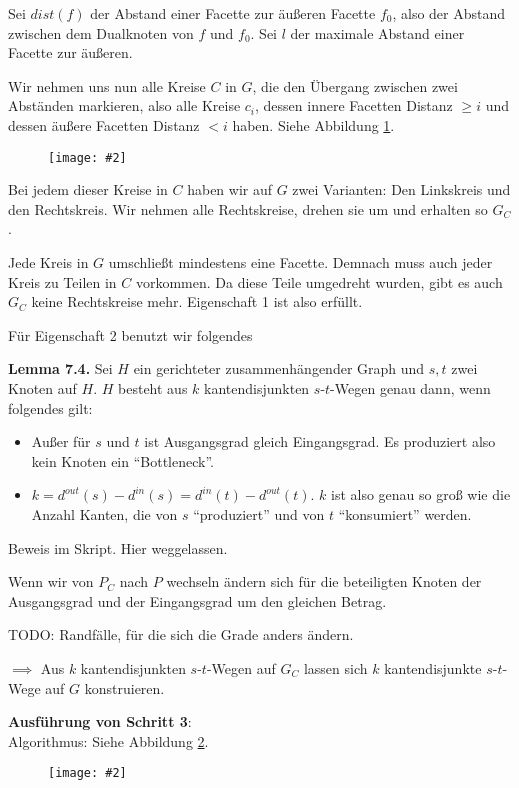 \documentclass[10pt,a4paper]{article}
\makeatletter
\def\maxwidth#1{\ifdim\Gin@nat@width>#1 #1\else\Gin@nat@width\fi}
\newcommand{\imageFigure}[4]{%
    \begin{figure}[h]%
        \centering%
        {%
            \setlength{\fboxsep}{1pt}%
            \setlength{\fboxrule}{1pt}%
            \texttt{[image: \#2]}%
        }%
        \caption{#1}%
        \label{fig:#4}%
    \end{figure}%
}
\makeatother
\begin{document}
Sei $dist(f)$ der Abstand einer Facette zur äußeren Facette $f_0$, also der
Abstand zwischen dem Dualknoten von $f$ und $f_0$.
Sei $l$ der maximale Abstand einer Facette zur äußeren.

Wir nehmen uns nun alle Kreise $C$ in $G$, die den Übergang zwischen zwei
Abständen markieren, also alle Kreise $c_i$, dessen innere Facetten Distanz
$\geq i$ und dessen äußere Facetten Distanz $< i$ haben.
Siehe Abbildung \ref{fig:menger2}.

\imageFigure{}{menger2.png}{.75}{menger2}

Bei jedem dieser Kreise in $C$ haben wir auf $G$ zwei Varianten: Den Linkskreis
und den Rechtskreis.
Wir nehmen alle Rechtskreise, drehen sie um und erhalten so $G_C$.

Jede Kreis in $G$ umschließt mindestens eine Facette.
Demnach muss auch jeder Kreis zu Teilen in $C$ vorkommen.
Da diese Teile umgedreht wurden, gibt es auch $G_C$ keine Rechtskreise mehr.
Eigenschaft 1 ist also erfüllt.

Für Eigenschaft 2 benutzt wir folgendes

\textbf{Lemma 7.4.} Sei $H$ ein gerichteter zusammenhängender Graph und $s, t$
zwei Knoten auf $H$.
$H$ besteht aus $k$ kantendisjunkten $s$-$t$-Wegen genau dann, wenn folgendes
gilt:
\begin{itemize}
    \item Außer für $s$ und $t$ ist Ausgangsgrad gleich Eingangsgrad.
        Es produziert also kein Knoten ein \enquote{Bottleneck}.
    \item $k = d^{out}(s) - d^{in}(s) = d^{in}(t) - d^{out}(t)$.
        $k$ ist also genau so groß wie die Anzahl Kanten, die von $s$
        \enquote{produziert} und von $t$ \enquote{konsumiert} werden.
\end{itemize}

Beweis im Skript. Hier weggelassen.

Wenn wir von $P_C$ nach $P$ wechseln ändern sich für die beteiligten Knoten
der Ausgangsgrad und der Eingangsgrad um den gleichen Betrag.

TODO: Randfälle, für die sich die Grade anders ändern. %

$\implies$ Aus $k$ kantendisjunkten $s$-$t$-Wegen auf $G_C$ lassen sich $k$
kantendisjunkte $s$-$t$-Wege auf $G$ konstruieren.

\textbf{Ausführung von Schritt 3}:\\
Algorithmus: Siehe Abbildung \ref{fig:menger3}.
\imageFigure{}{menger3.png}{1}{menger3}
\end{document}
